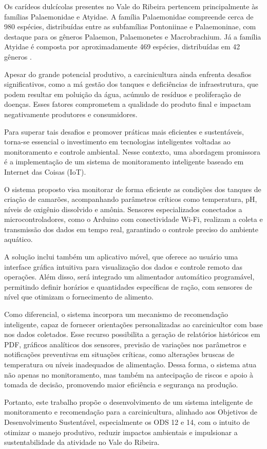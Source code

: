 Os carídeos dulcícolas presentes no Vale do Ribeira pertencem principalmente às famílias Palaemonidae e Atyidae. A família Palaemonidae compreende cerca de 980 espécies, distribuídas entre as subfamílias Pontoniinae e Palaemoninae, com destaque para os gêneros Palaemon, Palaemonetes e Macrobrachium. Já a família Atyidae é composta por aproximadamente 469 espécies, distribuídas em 42 gêneros \cite{bertini2021}.

Apesar do grande potencial produtivo, a carcinicultura ainda enfrenta desafios significativos, como a má gestão dos tanques e deficiências de infraestrutura, que podem resultar em poluição da água, acúmulo de resíduos e proliferação de doenças. Esses fatores comprometem a qualidade do produto final e impactam negativamente produtores e consumidores.

Para superar tais desafios e promover práticas mais eficientes e sustentáveis, torna-se essencial o investimento em tecnologias inteligentes voltadas ao monitoramento e controle ambiental. Nesse contexto, uma abordagem promissora é a implementação de um sistema de monitoramento inteligente baseado em Internet das Coisas (IoT).

O sistema proposto visa monitorar de forma eficiente as condições dos tanques de criação de camarões, acompanhando parâmetros críticos como temperatura, pH, níveis de oxigênio dissolvido e amônia. Sensores especializados conectados a microcontroladores, como o Arduino com conectividade Wi-Fi, realizam a coleta e transmissão dos dados em tempo real, garantindo o controle preciso do ambiente aquático.

A solução inclui também um aplicativo móvel, que oferece ao usuário uma interface gráfica intuitiva para visualização dos dados e controle remoto das operações. Além disso, será integrado um alimentador automático programável, permitindo definir horários e quantidades específicas de ração, com sensores de nível que otimizam o fornecimento de alimento.

Como diferencial, o sistema incorpora um mecanismo de recomendação inteligente, capaz de fornecer orientações personalizadas ao carcinicultor com base nos dados coletados. Esse recurso possibilita a geração de relatórios históricos em PDF, gráficos analíticos dos sensores, previsão de variações nos parâmetros e notificações preventivas em situações críticas, como alterações bruscas de temperatura ou níveis inadequados de alimentação. Dessa forma, o sistema atua não apenas no monitoramento, mas também na antecipação de riscos e apoio à tomada de decisão, promovendo maior eficiência e segurança na produção.

Portanto, este trabalho propõe o desenvolvimento de um sistema inteligente de monitoramento e recomendação para a carcinicultura, alinhado aos Objetivos de Desenvolvimento Sustentável, especialmente os ODS 12 e 14, com o intuito de otimizar o manejo produtivo, reduzir impactos ambientais e impulsionar a sustentabilidade da atividade no Vale do Ribeira.